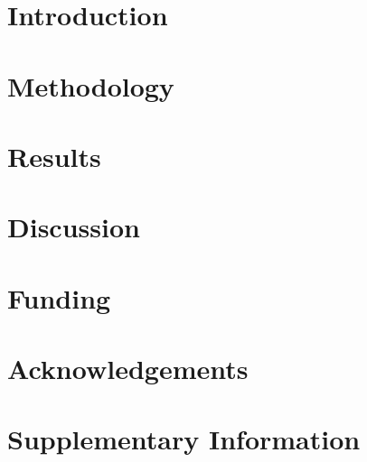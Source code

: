 \documentclass{article}
\begin{document}

\section{Introduction}\label{intro}


\section{Methodology}\label{method}


\section{Results}\label{results}


\section{Discussion}\label{discuss}


\section*{Funding}


\section*{Acknowledgements}





\newpage
\section*{Supplementary Information}
\beginsupplement


\end{document}
